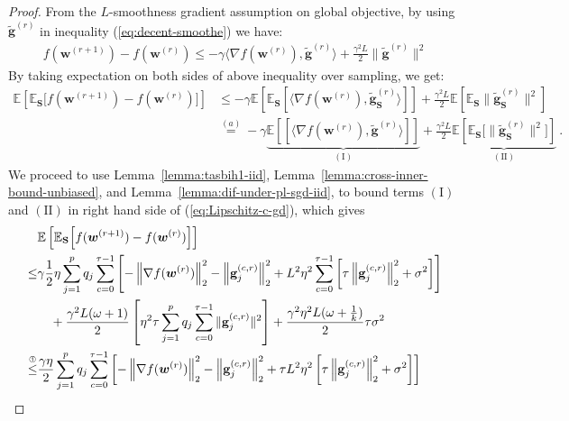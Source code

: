 \documentclass[sigconf, anonymous, review]{acmart}
\begin{document}
\begin{proof}
From the $L$-smoothness gradient assumption on global objective, by using  $\tilde{\mathbf{g}}^{(r)}$ in inequality (\ref{eq:decent-smoothe}) we have:
\begin{align}
    f({\boldsymbol{w}}^{(r+1)})-f({\boldsymbol{w}}^{(r)})\leq -\gamma \big\langle\nabla f({\boldsymbol{w}}^{(r)}),\tilde{\mathbf{g}}^{(r)}\big\rangle+\frac{\gamma^2 L}{2}\|\tilde{\mathbf{g}}^{(r)}\|^2\label{eq:Lipschitz-c1}
\end{align}
By taking expectation on both sides of above inequality over sampling, we get:
\begin{align}
    \mathbb{E}\left[\mathbb{E}_\mathbf{S}\Big[f({\boldsymbol{w}}^{(r+1)})-f({\boldsymbol{w}}^{(r)})\Big]\right]&\leq -\gamma\mathbb{E}\left[\mathbb{E}_\mathbf{S}\left[ \big\langle\nabla f({\boldsymbol{w}}^{(r)}),\tilde{\mathbf{g}}_\mathbf{S}^{(r)}\big\rangle\right]\right]+\frac{\gamma^2 L}{2}\mathbb{E}\left[\mathbb{E}_\mathbf{S}\|\tilde{\mathbf{g}}_\mathbf{S}^{(r)}\|^2\right]\nonumber\\
    &\stackrel{(a)}{=}-\gamma\underbrace{\mathbb{E}\left[\left[ \big\langle\nabla f({\boldsymbol{w}}^{(r)}),\tilde{\mathbf{g}}^{(r)}\big\rangle\right]\right]}_{(\mathrm{I})}+\frac{\gamma^2 L}{2}\underbrace{\mathbb{E}\left[\mathbb{E}_\mathbf{S}\Big[\|\tilde{\mathbf{g}}_\mathbf{S}^{(r)}\|^2\Big]\right]}_{\mathrm{(II)}} \ . \label{eq:Lipschitz-c-gd}
\end{align}
We proceed to use Lemma~\ref{lemma:tasbih1-iid}, Lemma~\ref{lemma:cross-inner-bound-unbiased}, and Lemma~\ref{lemma:dif-under-pl-sgd-iid}, to bound  terms $(\mathrm{I})$ and $(\mathrm{II})$ in right hand side of (\ref{eq:Lipschitz-c-gd}), which gives
\begin{align}
     &\mathbb{E}\left[\mathbb{E}_{\mathbf{S}}\Big[f({\boldsymbol{w}}^{(r+1)})-f({\boldsymbol{w}}^{(r)})\Big]\right]\nonumber\\
     \leq& \gamma\frac{1}{2}\eta\sum_{j=1}^pq_j\sum_{c=0}^{\tau-1}\left[-\left\|\nabla f({\boldsymbol{w}}^{(r)})\right\|_2^2-\left\|\mathbf{g}_j^{(c,r)}\right\|_2^2+L^2\eta^2\sum_{c=0}^{\tau-1}\left[\tau\left\|{\mathbf{g}}_j^{(c,r)}\right\|_2^2+\sigma^2\right]\right]\nonumber\\
     &\quad+\frac{\gamma^2 L(\omega+1)}{2}\left[{\eta^2\tau}\sum_{j=1}^pq_j\sum_{c=0}^{\tau-1}\|\mathbf{g}^{(c,r)}_{j}\|^2\right]+\frac{\gamma^2\eta^2 L(\omega+\frac{1}{k})}{2}{\tau \sigma^2}\nonumber\\
     \stackrel{\text{\ding{192}}}{\leq}&\frac{\gamma\eta}{2}\sum_{j=1}^pq_j\sum_{c=0}^{\tau-1}\left[-\left\|\nabla f({\boldsymbol{w}}^{(r)})\right\|_2^2-\left\|\mathbf{g}_j^{(c,r)}\right\|_2^2+\tau L^2\eta^2\left[\tau\left\|{\mathbf{g}}_j^{(c,r)}\right\|_2^2+\sigma^2\right]\right]\nonumber\\

\end{align}
\end{proof}
\end{document}
